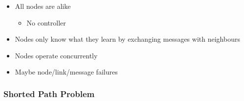 \begin{itemize}
\begin{itemize}
            \item All nodes are alike
                \begin{itemize}
                    \item No controller
                \end{itemize}
            \item Nodes only know what they learn by exchanging messages with neighbours
            \item Nodes operate concurrently
            \item Maybe node/link/message failures
        \end{itemize}
\end{itemize}


\subsubsection{Shorted Path Problem}
